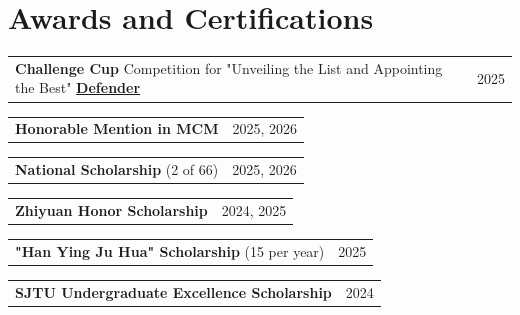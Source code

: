 \documentclass[letterpaper,11pt]{article}
\makeatletter
\newcommand{\twopartheader}[2]{
  \vspace{-2pt}\noindent
  \begin{tabular*}{\textwidth}{l@{\extracolsep{\fill}}r}
    #1 & #2 \\
  \end{tabular*}\vspace{-7pt}
}
\makeatother
\begin{document}
\section{Awards and Certifications}

\twopartheader{\textbf{Challenge Cup} Competition for "Unveiling the List and Appointing the Best" \textbf{\href{https://mp.weixin.qq.com/s/aO85Qtgv1q-AhClfEu4Gpw}{Defender}}}{2025}

\twopartheader{\textbf{Honorable Mention in MCM}}{2025, 2026}

\twopartheader{\textbf{National Scholarship} (2 of 66)}{2025, 2026}

\twopartheader{\textbf{Zhiyuan Honor Scholarship}}{2024, 2025}

\twopartheader{\textbf{"Han Ying Ju Hua" Scholarship} (15 per year)}{2025}

\twopartheader{\textbf{SJTU Undergraduate Excellence Scholarship}}{2024}
\end{document}
